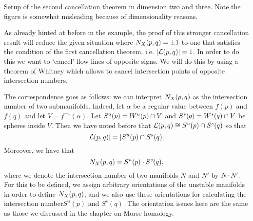 \begin{marginfigure}
    \centering
    \caption{Setup of the second cancellation theorem in dimension two and three. Note the figure is somewhat misleading because of dimensionality reasons.}
    \label{fig:second-cancellation-theorem-setup}
\end{marginfigure}
As already hinted at before in the example, the proof of this stronger cancellation result will reduce the given situation where $N_{X}(p, q) = \pm 1$ to one that satisfies the condition of the first cancellation theorem, i.e. $| \mathcal L(p, q) | = 1$.
In order to do this we want to `cancel' flow lines of opposite signs.
We will do this by using a theorem of Whitney which allows to cancel intersection points of opposite intersection numbers.

The correspondence goes as follows: we can interpret $N_{X}(p, q)$ as the intersection number of two submanifolds.
Indeed, let $\alpha$ be a regular value between  $f(p)$ and  $f(q)$ and let $V = f^{-1}(\alpha)$.
Let $S^{u}(p) = W^u(p) \cap V$ and 
$S^{s}(q) = W^s(q) \cap V$ be spheres inside $V$.
Then we have noted before that $\mathcal L(p, q) \cong S^{u}(p) \cap S^{s}(q)$ so that \[
    | \mathcal L(p, q)| = |S^{u}(p) \cap S^{s}(q)|.
\]
Moreover, we have that
\[
    N_{X}(p, q) = S^{u}(p) \cdot S^{s}(q)
,\] 
where we denote the intersection number of two manifolds $N$ and $N'$ by $N \cdot N'$.
For this to be defined, we assign arbitrary orientations of the unstable manifolds in order to define $N_{X}(p, q)$, and we also use these orientations for calculating the intersection number$S^{u}(p)$ and $S^{s}(q)$.
The orientation issues here are the same as those we discussed in the chapter on Morse homology.

